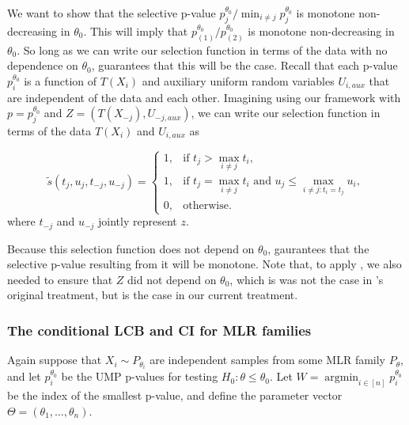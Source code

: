 \documentclass{article}
\DeclareMathOperator*{\argmin}{argmin}
\begin{document}
\begin{appendix}
We want to show that the selective p-value $p^{\theta_0}_j/\min_{i \neq j} p^{\theta_0}_j$ is monotone non-decreasing in $\theta_0$. This will imply that $p^{\theta_0}_{(1)}/p^{\theta_0}_{(2)}$ is monotone non-decreasing in $\theta_0$. So long as we can write our selection function in terms of the data with no dependence on $\theta_0$,  guarantees that this will be the case. Recall that each p-value $p^{\theta_0}_i$ is a function of $T(X_i)$ and auxiliary uniform random variables $U_{i, aux}$ that are independent of the data and each other. Imagining using our framework with $p=p^{\theta_0}_j$ and $Z=(T(X_{-j}), U_{-j, aux})$, we can write our selection function in terms of the data $T(X_i)$ and $U_{i, aux}$ as 

\begin{equation*}
    \tilde{s}(t_j, u_j, t_{-j}, u_{-j}) =
    \begin{cases} 
    1, & \text{if } t_j > \max_{i \neq j } t_i, \\
    1, & \text{if } t_j = \max_{i \neq j } t_i \text{ and } u_j \leq \max_{i \neq j : t_i = t_j} u_i, \\
    0, & \text{otherwise}.
\end{cases}
\end{equation*}
where $t_{-j}$ and $u_{-j}$ jointly represent $z$. 

Because this selection function does not depend on $\theta_0$,  gaurantees that the selective p-value resulting from it will be monotone. Note that, to apply , we also needed to ensure that $Z$ did not depend on $\theta_0$, which is was not the case in 's original treatment, but is the case in our current treatment. 

\subsubsection{The conditional LCB and CI for MLR families}
Again suppose that $X_i \sim P_{\theta_i}$ are independent samples from some MLR family $P_{\theta}$, and let $p^{\theta_0}_i$ be the UMP p-values for testing $H_0 : \theta \leq \theta_0$. Let $W = \argmin_{i \in [n]} p^{\theta_0}_i$ be the index of the smallest p-value, and define the parameter vector $\Theta = (\theta_1, \dots, \theta_n)$. 


\end{appendix}
\end{document}
